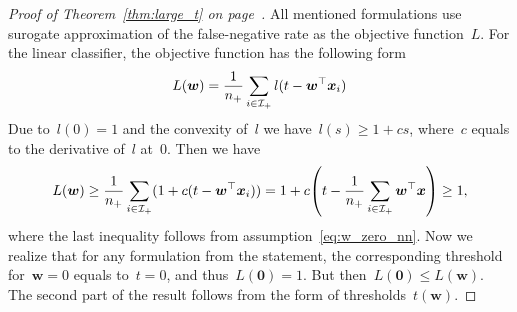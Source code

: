 \larget*
\begin{proof}[Proof of Theorem~\ref{thm:large_t} on page~\pageref{thm:large_t}]
  All mentioned formulations use surogate approximation of the false-negative rate as the objective function~$L.$ For the linear classifier, the objective function has the following form
  \begin{equation*}
    L(\bm{w})
      = \frac{1}{n_{+}}\sum_{i \in \mathcal{I}_{+}}l(t - \bm{w}^\top \bm{x}_i)
  \end{equation*}
  Due to~$l(0) = 1$ and the convexity of~$l$ we have~$l(s) \ge 1 + cs$, where~$c$ equals to the derivative of~$l$ at~$0$. Then we have
  \begin{equation*}
    L(\bm{w}) 
      \ge \frac{1}{\npos} \sum_{i \in \Ipos}(1 + c(t-\bm{w}^\top \bm{x}_i))
      = 1 + c\Brac{t - \frac{1}{\npos}\sum_{i \in \Ipos}\bm{w}^\top \bm{x}}
      \ge 1,
  \end{equation*}
  where the last inequality follows from assumption~\eqref{eq:w_zero_nn}. Now we realize that for any formulation from the statement, the corresponding threshold for~$\bm{w}=0$ equals to~$t=0$, and thus~$L(\bm{0})=1$. But then~$L(\bm{0}) \le L(\bm{w})$. The second part of the result follows from the form of thresholds~$t(\bm{w})$.
\end{proof}

